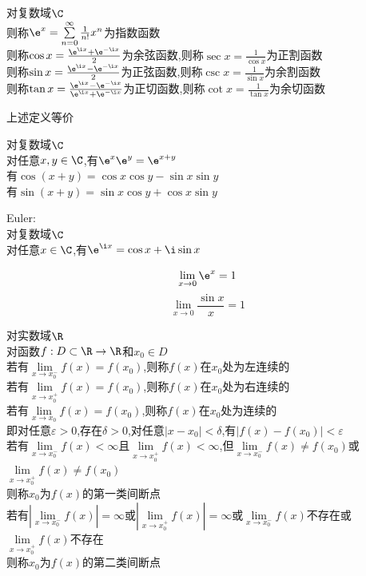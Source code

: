 \begin{dingyi}
对复数域$\C$\\
则称$\e^x=\sum\limits_{n=0}^{\infty}\frac{1}{n!}x^n$为指数函数\\
则称$\cos x=\frac{\e^{\i x}+\e^{-\i x}}{2}$为余弦函数,则称$\sec x=\frac{1}{\cos x}$为正割函数\\
则称$\sin x=\frac{\e^{\i x}-\e^{-\i x}}{2}$为正弦函数,则称$\csc x=\frac{1}{\sin x}$为余割函数\\
则称$\tan x=\frac{\e^{\i x}-\e^{-\i x}}{\e^{\i x}+\e^{-\i x}}$为正切函数,则称$\cot x=\frac{1}{\tan x}$为余切函数
\end{dingyi}

\begin{zhu}
上述定义等价
\end{zhu}

\begin{dingli}
对复数域$\C$\\
对任意$x,y\in \C$,有$\e^{x}\e^{y}=\e^{x+y}$\\
有$\cos(x+y)=\cos x\cos y-\sin x\sin y$\\
有$\sin(x+y)=\sin x\cos y+\cos x\sin y$
\end{dingli}

\begin{dingyi}
Euler:\\
对复数域$\C$\\
对任意$x\in \C$,有$\e^{\i x}=\cos x+\i\sin x$
\end{dingyi}

\begin{dingli}
\[\lim\limits_{x\to 0}\e^x=1\]
\[\lim\limits_{x\to 0}\frac{\sin x}{x}=1\]
\end{dingli}

\begin{dingyi}
对实数域$\R$\\
对函数$f:D\subset \R \to \R$和$x_0\in D$\\
若有$\lim\limits_{x\to x_0^{-}}f(x)=f(x_0)$,则称$f(x)$在$x_0$处为左连续的\\
若有$\lim\limits_{x\to x_0^{+}}f(x)=f(x_0)$,则称$f(x)$在$x_0$处为右连续的\\
若有$\lim\limits_{x\to x_0}f(x)=f(x_0)$,则称$f(x)$在$x_0$处为连续的\\
即对任意$\varepsilon>0$,存在$\delta>0$,对任意$|x-x_0|<\delta$,有$|f(x)-f(x_0)|<\varepsilon$\\
若有$\lim\limits_{x\to x_0^{-}}f(x)<\infty$且$\lim\limits_{x\to x_0^{+}}f(x)<\infty$,但$\lim\limits_{x\to x_0^{-}}f(x)\neq f(x_0)$或$\lim\limits_{x\to x_0^{+}}f(x)\neq f(x_0)$\\
则称$x_0$为$f(x)$的第一类间断点\\
若有$|\lim\limits_{x\to x_0^{-}}f(x)|=\infty$或$|\lim\limits_{x\to x_0^{+}}f(x)|=\infty$或$\lim\limits_{x\to x_0^{-}}f(x)$不存在或$\lim\limits_{x\to x_0^{+}}f(x)$不存在\\
则称$x_0$为$f(x)$的第二类间断点
\end{dingyi}

